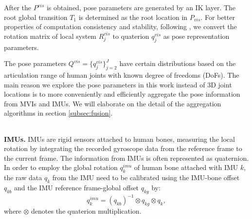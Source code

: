 \documentclass[lettersize,journal]{IEEEtran}
\begin{document}
After the $P^{vis}$ is obtained, pose parameters are generated by an IK layer. The root global transition $T_{1}$ is determined as the root location in $P_{vis}$. For better properties of computation consistency and stability, following \cite{pavllo2020modeling}, we convert the rotation matrix of local system $R_{j}^{vis}$ to quaterion $q_{j}^{vis}$ as pose representation parameters.

The pose parameters $Q^{vis} = \lbrace q_{j}^{vis}\rbrace_{j=2}^{J}$ have certain distributions based on the articulation range of human joints with known degree of freedoms (DoFs). The main reason we explore the pose parameters in this work instead of 3D joint locations is to more conveniently and efficiently aggregate the pose information from MVIs and IMUs. We will elaborate on the detail of the aggregation algorithms in section \ref{subsec:fusion}.

~\\
\noindent \textbf{IMUs.}
\quad IMUs are rigid sensors attached to human bones, measuring the local rotation by integrating the recorded gyroscope data from the reference frame to the current frame. The information from IMUs is often represented as quaternion. In order to employ the global rotation $q_{k}^{imu}$ of human bone attached with IMU $k$, the raw data $q_{k}$ from the IMU need to be calibrated using the IMU-bone offset $q_{kb}$ and the IMU reference frame-global offset $q_{kg}$ by:
\begin{equation}
q_{k}^{imu} = (q_{kb})^{-1} \otimes q_{kg} \otimes q_{k},
\end{equation}
where  $\otimes$ denotes the quaterion multiplication.
\end{document}
